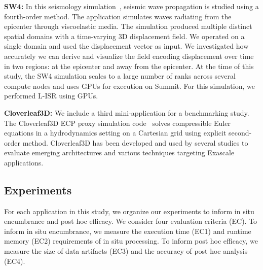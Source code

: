 \textbf{SW4:} In this seismology simulation~\cite{petersson2015wave}, seismic wave propagation is studied using a fourth-order method.
%
The application simulates waves radiating from the epicenter through viscoelastic media. 
%
The simulation produced multiple distinct spatial domains with a time-varying 3D displacement field.
%
We operated on a single domain and used the displacement vector as input.
%
We investigated how accurately we can derive and visualize the field encoding displacement over time in two regions: at the epicenter and away from the epicenter.
%
At the time of this study, the SW4 simulation scales to a large number of ranks across several compute nodes and uses GPUs for execution on Summit.
%
For this simulation, we performed L-ISR using GPUs.
%

\textbf{Cloverleaf3D:} We include a third mini-application for a benchmarking study. The Cloverleaf3D ECP proxy simulation code~\cite{mallinson2013cloverleaf} solves compressible Euler equations in a hydrodynamics setting on a Cartesian grid using explicit second-order method.
%
Cloverleaf3D has been developed and used by several studies to evaluate emerging architectures and various techniques targeting Exascale applications.

%
\subsection{Experiments}
\label{sec:experiments}

For each application in this study, we organize our experiments to inform in situ encumbrance and post hoc efficacy. 
%
We consider four evaluation criteria (EC).
%
To inform in situ encumbrance,  we measure the execution time (EC1) and runtime memory (EC2) requirements of in situ processing.
%
To inform post hoc efficacy, we measure the size of data artifacts (EC3) and the accuracy of post hoc analysis (EC4).

